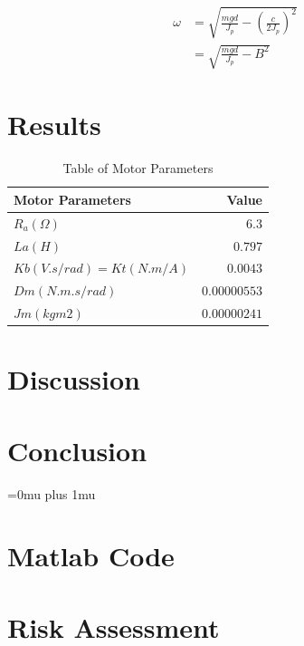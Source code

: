 \documentclass[a4paper, 12pt, compsoc]{IEEEtran}
\begin{document}
        \begin{equation}\label{eq:omega}
            \begin{split}
                \omega & = \sqrt{\frac{mgd}{J_p} - \left(\frac{c}{2J_p}\right)^2} \\ 
                  & = \sqrt{\frac{mgd}{J_p} - B^2}
            \end{split}
        \end{equation}

    \section{Results}\label{sec:results}
        \begin{table}
            \centering
            \caption{Table of Motor Parameters}
            \label{tab:motorValues}
            \begin{tabular}{l|r}
                Motor Parameters  & Value\\
                \hline
                $R_a (\Omega)$ & $6.3$\\
                $La (H)$ & $0.797$ \\
                $Kb (V.s/rad) = Kt (N.m/A)$ & $0.0043$ \\
                $Dm (N.m.s/rad)$ & $0.00000553$ \\
                $Jm (kgm2)$ & $0.00000241$
            \end{tabular}
        \end{table}
    \section{Discussion}\label{sec:discussion}
    \section{Conclusion}\label{sec:conclusion}


    \Urlmuskip=0mu plus 1mu\relax
    
    

    \onecolumn
    \appendices
        \section{Matlab Code}
            
            
        \section{Risk Assessment}
\end{document}
